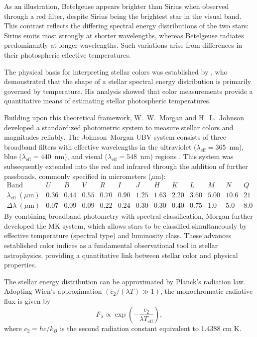 As an illustration, Betelgeuse appears brighter than Sirius when observed through a red filter, despite Sirius being the brightest star in the visual band. This contrast reflects the differing spectral energy distributions of the two stars: Sirius emits most strongly at shorter wavelengths, whereas Betelgeuse radiates predominantly at longer wavelengths. Such variations arise from differences in their photospheric effective temperatures.

The physical basis for interpreting stellar colors was established by \cite{1900schwarzschild}, who demonstrated that the shape of a stellar spectral energy distribution is primarily governed by temperature. His analysis showed that color measurements provide a quantitative means of estimating stellar photospheric temperatures.

Building upon this theoretical framework, W.~W.~Morgan and H.~L.~Johnson developed a standardized photometric system to measure stellar colors and magnitudes reliably. The Johnson--Morgan UBV system consists of three broadband filters with effective wavelengths in the ultraviolet ($\lambda_{\mathrm{eff}} = 365$~nm), blue ($\lambda_{\mathrm{eff}} = 440$~nm), and visual ($\lambda_{\mathrm{eff}} = 548$~nm) regions \citep{1953johnson}. This system was subsequently extended into the red and infrared through the addition of further passbands, commonly specified in micrometers ($\mu$m):
\[
\begin{array}{ccccccccccccc}
\text{Band} & U & B & V & R & I & J & H & K & L & M & N & Q \\
\lambda_{\mathrm{eff}}~(\mu\mathrm{m}) &
0.36 & 0.44 & 0.55 & 0.70 & 0.90 & 1.25 & 1.63 & 2.20 & 3.60 & 5.00 & 10.6 & 21 \\
\Delta\lambda~(\mu\mathrm{m}) &
0.07 & 0.09 & 0.09 & 0.22 & 0.24 & 0.30 & 0.30 & 0.40 & 0.75 & 1.0 & 5.0 & 8.0
\end{array}
\]
By combining broadband photometry with spectral classification, Morgan further developed the MK system, which allows stars to be classified simultaneously by effective temperature (spectral type) and luminosity class. These advances established color indices as a fundamental observational tool in stellar astrophysics, providing a quantitative link between stellar color and physical properties.

The stellar energy distribution can be approximated by Planck’s radiation law. Adopting Wien’s approximation \(\left( c_2/(\lambda T) \gg 1 \right)\), the monochromatic radiative flux is given by
\begin{equation}
F_\lambda \propto \exp\!\left(-\frac{c_2}{\lambda T_{\mathrm{eff}}}\right),
\end{equation}
where \(c_2 = hc/k_B \) is the second radiation constant equivalent to 1.4388 cm K.

